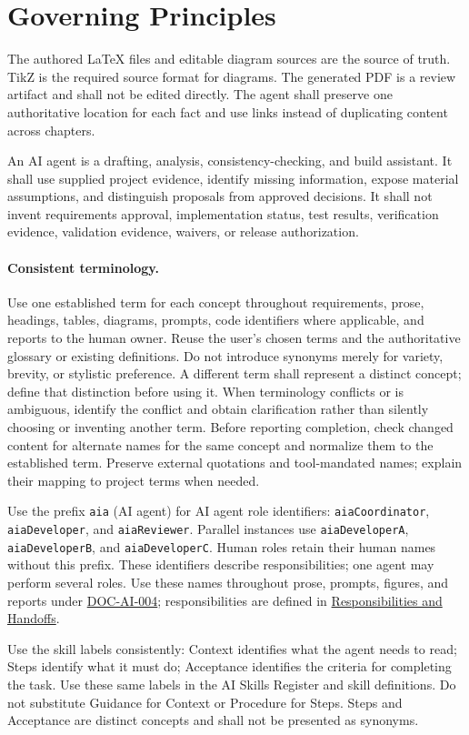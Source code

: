 \section{Governing Principles}
The authored LaTeX files and editable diagram sources are the source of truth.
TikZ is the required source format for diagrams.
The generated PDF is a review artifact and shall not be edited directly. The
agent shall preserve one authoritative location for each fact and use links
instead of duplicating content across chapters.

An AI agent is a drafting, analysis, consistency-checking, and build assistant.
It shall use supplied project evidence, identify missing information, expose
material assumptions, and distinguish proposals from approved decisions. It
shall not invent requirements approval, implementation status, test results,
verification evidence, validation evidence, waivers, or release authorization.

\paragraph{Consistent terminology.}\label{Rule:AITerminologyConsistency}
Use one established term for each concept throughout requirements, prose,
headings, tables, diagrams, prompts, code identifiers where applicable, and
reports to the human owner. Reuse the user's chosen terms and the authoritative
glossary or existing definitions. Do not introduce synonyms merely for variety,
brevity, or stylistic preference. A different term shall represent a distinct
concept; define that distinction before using it. When terminology conflicts or
is ambiguous, identify the conflict and obtain clarification rather than
silently choosing or inventing another term. Before reporting completion,
check changed content for alternate names for the same concept and normalize
them to the established term. Preserve external quotations and tool-mandated
names; explain their mapping to project terms when needed.

\begingroup\raggedright
Use the prefix \texttt{aia} (AI agent) for AI agent role identifiers:
\texttt{aiaCoordinator}, \texttt{aiaDeveloper}, and \texttt{aiaReviewer}.
Parallel instances use \texttt{aiaDeveloperA}, \texttt{aiaDeveloperB}, and
\texttt{aiaDeveloperC}. Human roles retain their human names without this
prefix. These identifiers describe responsibilities; one agent may perform
several roles. Use these names throughout prose, prompts, figures, and reports
under \hyperref[Requirement:DOCAI004]{DOC-AI-004}; responsibilities are defined
in \hyperref[Section:AIAgentRoles]{Responsibilities and Handoffs}.\par\endgroup
Use the skill labels consistently: Context identifies what the agent needs
to read; Steps identify what it must do; Acceptance identifies the criteria
for completing the task. Use these same labels in the AI Skills Register and skill
definitions. Do not substitute Guidance for Context or Procedure for Steps.
Steps and Acceptance are distinct concepts and shall not be presented as
synonyms.

